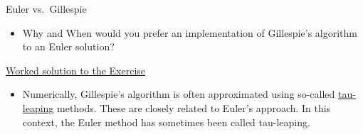 \documentclass[
  ignorenonframetext,
  aspectratio=169,
  t]{beamer}
\providecommand{\tightlist}{%
  \setlength{\itemsep}{0pt}\setlength{\parskip}{0pt}}\usepackage{longtable,booktabs,array}
\theoremstyle{definition}
\begin{document}
\begin{frame}{Euler vs.~Gillespie}
\label{euler-vs.-gillespie}
\begin{itemize}
\tightlist
\item
  Why and When would you prefer an implementation of Gillespie's
  algorithm to an Euler solution?
\end{itemize}

\vspace{3mm}

\href{./exercises.html\#exercise-euler-versus-gillespie}{Worked solution
to the Exercise}

\vspace{3mm}

\begin{itemize}
\tightlist
\item
  Numerically, Gillespie's algorithm is often approximated using
  so-called
  \href{https://en.wikipedia.org/wiki/Tau-leaping}{tau-leaping} methods.
  These are closely related to Euler's approach. In this context, the
  Euler method has sometimes been called tau-leaping.
\end{itemize}
\end{frame}
\end{document}
